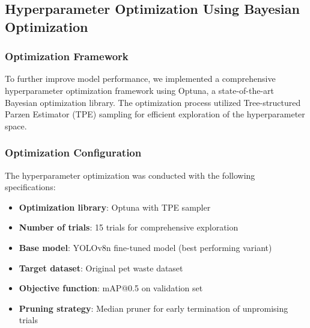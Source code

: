 \documentclass[12pt,a4paper]{article}
\begin{document}
\subsection{Hyperparameter Optimization Using Bayesian Optimization}

\subsubsection{Optimization Framework}
To further improve model performance, we implemented a comprehensive hyperparameter optimization framework using Optuna, a state-of-the-art Bayesian optimization library. The optimization process utilized Tree-structured Parzen Estimator (TPE) sampling for efficient exploration of the hyperparameter space.

\subsubsection{Optimization Configuration}
The hyperparameter optimization was conducted with the following specifications:
\begin{itemize}
    \item \textbf{Optimization library}: Optuna with TPE sampler
    \item \textbf{Number of trials}: 15 trials for comprehensive exploration
    \item \textbf{Base model}: YOLOv8n fine-tuned model (best performing variant)
    \item \textbf{Target dataset}: Original pet waste dataset
    \item \textbf{Objective function}: mAP@0.5 on validation set
    \item \textbf{Pruning strategy}: Median pruner for early termination of unpromising trials
\end{itemize}
\end{document}
